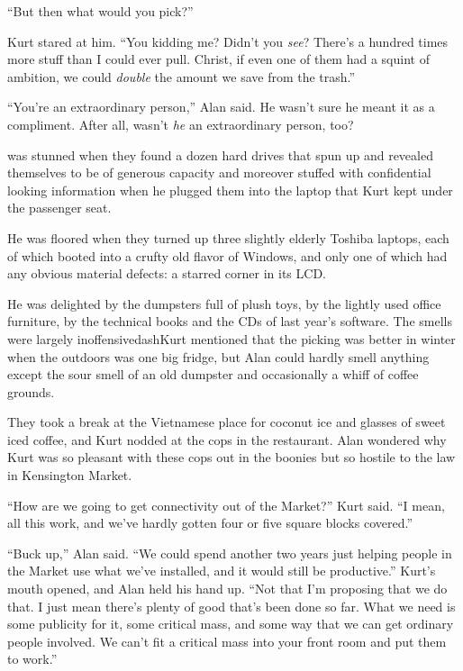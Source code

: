 ``But then what would you pick?''

Kurt stared at him.  ``You kidding me?  Didn't you \textit{see}? 
There's a hundred times more stuff than I could ever pull.  Christ, if
even one of them had a squint of ambition, we could \textit{double}
the amount we save from the trash.''

``You're an extraordinary person,'' Alan said.  He wasn't sure he
meant it as a compliment.  After all, wasn't \textit{he} an
extraordinary person, too?

 was stunned when they found a dozen hard drives that spun up and
revealed themselves to be of generous capacity and moreover stuffed
with confidential looking information when he plugged them into the
laptop that Kurt kept under the passenger seat.

He was floored when they turned up three slightly elderly Toshiba
laptops, each of which booted into a crufty old flavor of Windows, and
only one of which had any obvious material defects:  a starred corner
in its LCD.

He was delighted by the dumpsters full of plush toys, by the lightly
used office furniture, by the technical books and the CDs of last
year's software.  The smells were largely inoffensivedash{}Kurt mentioned
that the picking was better in winter when the outdoors was one big
fridge, but Alan could hardly smell anything except the sour smell of
an old dumpster and occasionally a whiff of coffee grounds.

They took a break at the Vietnamese place for coconut ice and glasses
of sweet iced coffee, and Kurt nodded at the cops in the restaurant. 
Alan wondered why Kurt was so pleasant with these cops out in the
boonies but so hostile to the law in Kensington Market.

``How are we going to get connectivity out of the Market?'' Kurt said. 
``I mean, all this work, and we've hardly gotten four or five square
blocks covered.''

``Buck up,'' Alan said.  ``We could spend another two years just
helping people in the Market use what we've installed, and it would
still be productive.'' Kurt's mouth opened, and Alan held his hand up. 
``Not that I'm proposing that we do that.  I just mean there's plenty
of good that's been done so far.  What we need is some publicity for
it, some critical mass, and some way that we can get ordinary people
involved.  We can't fit a critical mass into your front room and put
them to work.''

